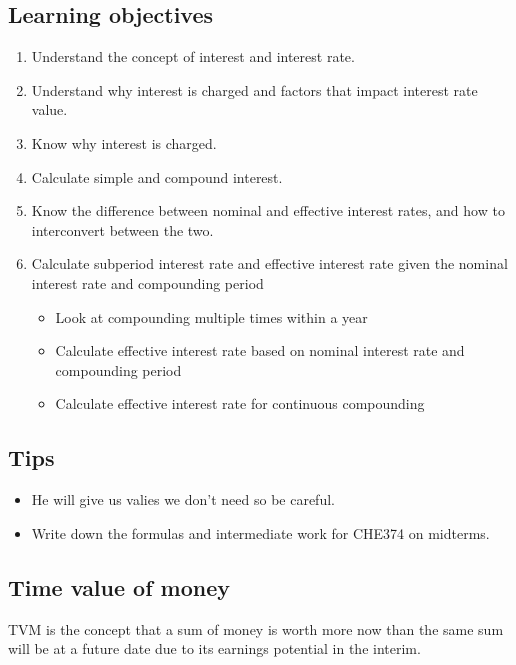 \subsection{Learning objectives}
\begin{definition}
    \begin{enumerate}
        \item Understand the concept of interest and interest rate. 
        \item Understand why interest is charged and factors that impact interest rate value.
        \item Know why interest is charged. 
        \item Calculate simple and compound interest.
        \item Know the difference between nominal and effective interest rates, and how to interconvert between the two.
        \item Calculate subperiod interest rate and effective interest rate given the nominal interest rate and compounding period
        \begin{itemize}
            \item Look at compounding multiple times within a year
            \item Calculate effective interest rate based on nominal interest rate and compounding period
            \item Calculate effective interest rate for continuous compounding
        \end{itemize}
    \end{enumerate}
\end{definition}

\subsection{Tips}
\begin{intuition}
    \begin{itemize}
        \item He will give us valies we don't need so be careful. 
        \item Write down the formulas and intermediate work for CHE374 on midterms.
    \end{itemize}
\end{intuition}

\subsection{Time value of money}
\begin{definition}
    TVM is the concept that a sum of money is worth more now than the same sum will be at a future date due to its earnings potential in the interim. 
\end{definition}

